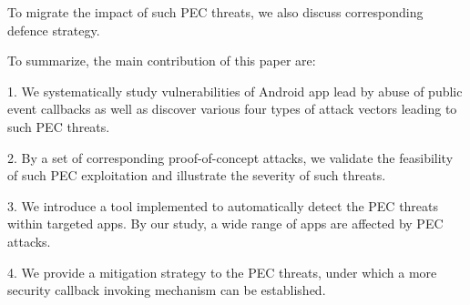 \documentclass{sig-alternate-05-2015}
\begin{document}
To migrate the impact of such PEC threats, we also discuss corresponding defence strategy. 

To summarize, the main contribution of this paper are:

1. We systematically study vulnerabilities of Android app lead by abuse of public event callbacks as well as discover various {\color{red}four} types of attack vectors leading to such PEC threats. 
 
2. By a set of corresponding proof-of-concept attacks, we validate the feasibility of such PEC exploitation and illustrate the severity of such threats. 

3. We introduce a tool implemented to automatically detect the PEC threats within targeted apps. By our study, a wide range of apps are affected by PEC attacks.

4. We provide a mitigation strategy to the PEC threats, under which a more security callback invoking mechanism can be established.

\end{document}
